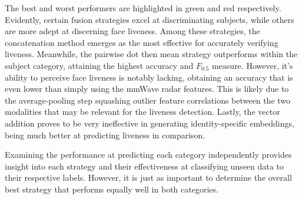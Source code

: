 \documentclass{mpaper}
\begin{document}
The best and worst performers are highlighted in green and red respectively. Evidently, certain fusion strategies excel at discriminating subjects, while others are more adept at discerning face liveness. Among these strategies, the concatenation method emerges as the most effective for accurately verifying liveness. Meanwhile, the pairwise dot then mean strategy outperforms within the subject category, attaining the highest accuracy and $F_{0.5}$ measure. However, it's ability to perceive face liveness is notably lacking, obtaining an accuracy that is even lower than simply using the mmWave radar features. This is likely due to the average-pooling step squashing outlier feature correlations between the two modalities that may be relevant for the liveness detection. Lastly, the vector addition proves to be very ineffective in generating identity-specific embeddings, being much better at predicting liveness in comparison. 

Examining the performance at predicting each category independently provides insight into each strategy and their effectiveness at classifying unseen data to their respective labels. However, it is just as important to determine the overall best strategy that performs equally well in both categories.

\begin{table}[h!]
    \centering
    \vspace{0.2cm}
    \caption{Averaged accuracy and $F_{0.5}$ score for the seven fusion strategies and non-hybrid models, applying equal weighting to subject and liveness predictions.}
    \label{tab:averaged_acc_fb}
    \vspace{-0.5cm}
\end{table}
\end{document}
